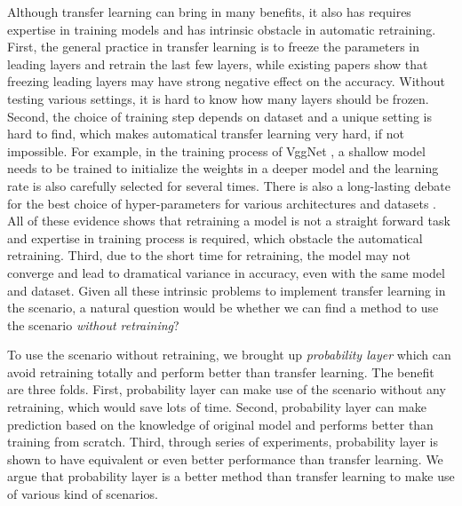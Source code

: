 \documentclass{article}
\begin{document}
Although transfer learning can bring in many benefits, it also has requires expertise in training models and has intrinsic obstacle in automatic retraining. First, the general practice in transfer learning is to freeze the parameters in leading layers and retrain the last few layers, while existing papers \cite{yosinski2014transferable} show that freezing leading layers may have strong negative effect on the accuracy. Without testing various settings, it is hard to know how many layers should be frozen. Second, the choice of training step depends on dataset and a unique setting is hard to find, which makes automatical transfer learning very hard, if not impossible. For example, in the training process of VggNet \cite{simonyan2014very}, a shallow model needs to be trained to initialize the weights in a deeper model and the learning rate is also carefully selected for several times. There is also a long-lasting debate for the best choice of hyper-parameters for various architectures and datasets \cite{bergstra2012random,  glorot2010understanding, he2015delving, smith2017don, wilson2003general}. All of these evidence shows that retraining a model is not a straight forward task and expertise in training process is required, which obstacle the automatical retraining. Third, due to the short time for retraining, the model may not converge and lead to dramatical variance in accuracy, even with the same model and dataset. Given all these intrinsic problems to implement transfer learning in the scenario, a natural question would be whether we can find a method to use the scenario \textit{without retraining}? 

To use the scenario without retraining, we brought up \textit{probability layer} which can avoid retraining totally and perform better than transfer learning. The benefit are three folds. First, probability layer can make use of the scenario without any retraining, which would save lots of time. Second, probability layer can make prediction based on the knowledge of original model and performs better than training from scratch. Third, through series of experiments, probability layer is shown to have equivalent or even better performance than transfer learning. We argue that probability layer is a better method than transfer learning to make use of various kind of scenarios. 
\end{document}
